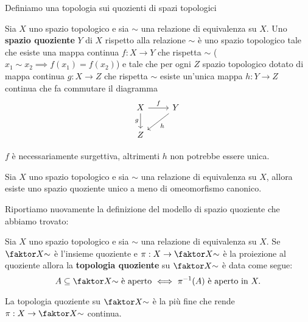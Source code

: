 \begin{multicols*}{2}
\noindent Definiamo una topologia sui quozienti di spazi topologici

\begin{definition}
Sia $X$ uno spazio topologico e sia $\sim$ una relazione di equivalenza su $X$. Uno \textbf{spazio quoziente} $Y$ di $X$ rispetto alla relazione $\sim$ \`e uno spazio topologico tale che esiste una mappa continua $f:X\to Y$ che rispetta $\sim$ ($x_1\sim x_2\implies f(x_1)=f(x_2)$) e tale che per ogni $Z$ spazio topologico dotato di mappa continua $g:X\to Z$ che rispetta $\sim$ esiste un'unica mappa $h:Y\to Z$ continua che fa commutare il diagramma
\[\begin{tikzcd}
	X & Y \\
	Z
	\arrow["g"', from=1-1, to=2-1]
	\arrow["f", from=1-1, to=1-2]
	\arrow["h", from=1-2, to=2-1]
\end{tikzcd}\]
\end{definition}
\begin{remark}
$f$ è necessariamente surgettiva, altrimenti $h$ non potrebbe essere unica.
\end{remark}

\begin{proposition}\label{EsistenzaUnicitaSpazioQuoziente}
Sia $X$ uno spazio topologico e sia $\sim$ una relazione di equivalenza su $X$, allora esiste uno spazio quoziente unico a meno di omeomorfismo canonico.
\end{proposition}

\noindent Riportiamo nuovamente la definizione del modello di spazio quoziente che abbiamo trovato:

\begin{definition}
Sia $X$ uno spazio topologico e sia $\sim$ una relazione di equivalenza su $X$. Se $\quot X\sim$ è l'insieme quoziente e $\pi:X\to \quot X\sim$ è la proiezione al quoziente allora la \textbf{topologia quoziente} su $\quot X\sim$ è data come segue:
\[A\subseteq \quot X\sim\text{ è aperto }\coimplies \ \pi\ii(A)\text{ è aperto in }X.\]
\end{definition}

\begin{theorem}\label{CaratterizzazioneTopologiaQuoziente}
La topologia quoziente su $\quot X\sim$ è la più fine che rende $\pi:X\to\quot X\sim$ continua.
\end{theorem}






\end{multicols*}
